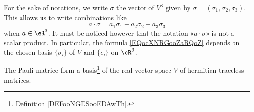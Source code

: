 For the sake of notations, we write \( \sigma\) the vector of \( V^3\) given by \( \sigma=(\sigma_1, \sigma_2, \sigma_3)\). This allows us to write combinations like
\begin{equation}        \label{EQooXNRGooZaRQoZ}
    a\cdot \sigma=a_1\sigma_1+a_2\sigma_2+a_3\sigma_3
\end{equation}
when \( a\in \eR^3\). It must be noticed however that the notation «\( a\cdot \sigma\)» is not a scalar product. In particular, the formula \eqref{EQooXNRGooZaRQoZ} depends on the chosen basis \( \{ \sigma_i \}\) of \( V\) and \( \{ e_i \}\) on \( \eR^3\).

\begin{lemma}       \label{LEMooZNCQooLgoReX}
    The Pauli matrice form a basis\footnote{Definition \ref{DEFooNGDSooEDAwTh}.} of the real vector space \( V\) of hermitian traceless matrices.
\end{lemma}

